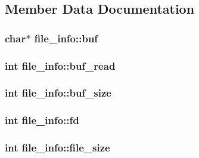 \subsection{Member Data Documentation}
\hypertarget{structfile__info_a2094ce0046c07f521ada8f1247280d95}{
\subsubsection[{buf}]{\setlength{\rightskip}{0pt plus 5cm}char$\ast$ file\+\_\+info\+::buf}}\label{structfile__info_a2094ce0046c07f521ada8f1247280d95}
\hypertarget{structfile__info_a5e7cd4b63da2cf9f297b68adfc1b5b99}{
\subsubsection[{buf\+\_\+read}]{\setlength{\rightskip}{0pt plus 5cm}int file\+\_\+info\+::buf\+\_\+read}}\label{structfile__info_a5e7cd4b63da2cf9f297b68adfc1b5b99}
\hypertarget{structfile__info_a29a3f8faa143e2c82fbd793dd49c6cd6}{
\subsubsection[{buf\+\_\+size}]{\setlength{\rightskip}{0pt plus 5cm}int file\+\_\+info\+::buf\+\_\+size}}\label{structfile__info_a29a3f8faa143e2c82fbd793dd49c6cd6}
\hypertarget{structfile__info_adccdbed71e76da97a23be347de511f42}{
\subsubsection[{fd}]{\setlength{\rightskip}{0pt plus 5cm}int file\+\_\+info\+::fd}}\label{structfile__info_adccdbed71e76da97a23be347de511f42}
\hypertarget{structfile__info_a3b73a528a567708069aae452c21290f2}{
\subsubsection[{file\+\_\+size}]{\setlength{\rightskip}{0pt plus 5cm}int file\+\_\+info\+::file\+\_\+size}}\label{structfile__info_a3b73a528a567708069aae452c21290f2}
